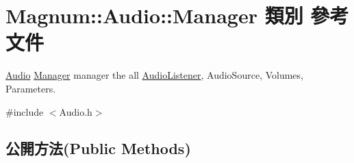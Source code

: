 \hypertarget{class_magnum_1_1_audio_1_1_manager}{}\section{Magnum\+:\+:Audio\+:\+:Manager 類別 參考文件}
\label{class_magnum_1_1_audio_1_1_manager}


\hyperlink{class_magnum_1_1_audio}{Audio} \hyperlink{class_magnum_1_1_audio_1_1_manager}{Manager} manager the all \hyperlink{class_magnum_1_1_audio_listener}{Audio\+Listener}, Audio\+Source, Volumes, Parameters.  




{\ttfamily \#include $<$Audio.\+h$>$}

\subsection*{公開方法(Public Methods)}
